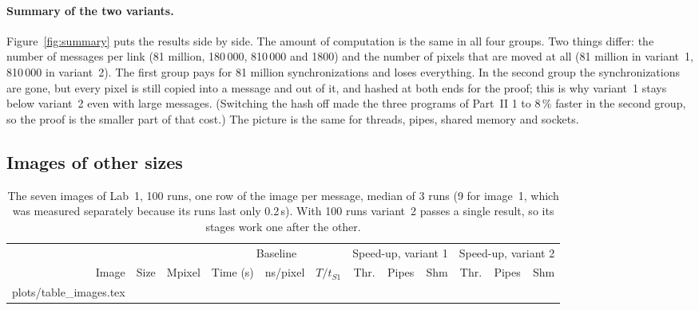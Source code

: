\documentclass[11pt,a4paper]{article}
\makeatletter
\newcommand{\rows}[1]{\@@input plots/#1.tex }
\makeatother
\begin{document}
\paragraph{Summary of the two variants.} Figure~\ref{fig:summary} puts the results side by side.
The amount of computation is the same in all four groups. Two things differ: the number of
messages per link (81 million, 180\,000, 810\,000 and 1800) and the number of pixels that are moved
at all (81 million in variant~1, 810\,000 in variant~2). The first group pays for 81 million
synchronizations and loses everything. In the second group the synchronizations are gone, but
every pixel is still copied into a message and out of it, and hashed at both ends for the proof;
this is why variant~1 stays below variant~2 even with large messages. (Switching the hash off made
the three programs of Part~II 1 to 8\,\% faster in the second group, so the proof is the smaller
part of that cost.) The picture is the same for threads, pipes, shared memory and sockets.

\subsection{Images of other sizes}

\begin{table}[H]
\centering\small
\setlength{\tabcolsep}{4.2pt}
\begin{tabular}{@{}rlrrrr rrr rrr@{}}
\toprule
& & & \multicolumn{3}{c}{Baseline} & \multicolumn{3}{c}{Speed-up, variant 1} & \multicolumn{3}{c}{Speed-up, variant 2} \\
\cmidrule(lr){4-6}\cmidrule(lr){7-9}\cmidrule(l){10-12}
Image & Size & Mpixel & Time (s) & ns/pixel & $T/t_{S1}$ & Thr. & Pipes & Shm & Thr. & Pipes & Shm \\
\midrule
\rows{table_images}
\bottomrule
\end{tabular}
\caption{The seven images of Lab~1, 100 runs, one row of the image per message, median of 3 runs
(9 for image~1, which was measured separately because its runs last only 0.2\,s).
With 100 runs variant~2 passes a single result, so its stages work one after the other.}
\label{tab:images}
\end{table}
\end{document}
